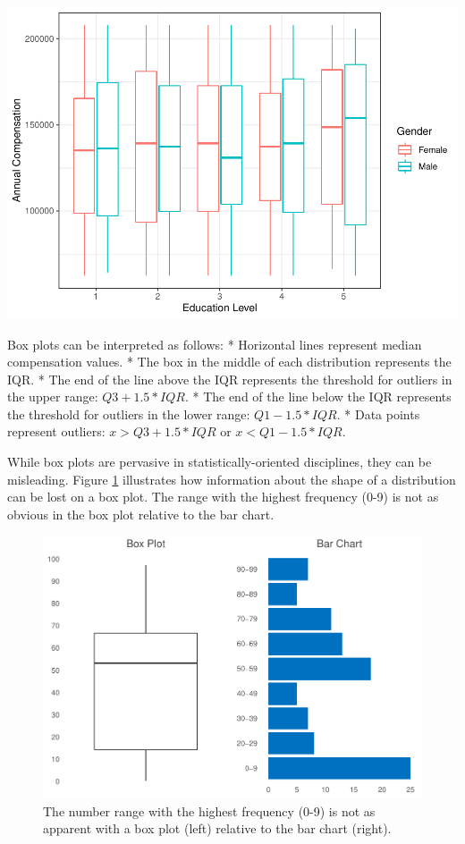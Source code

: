 \documentclass[
]{book}
\begin{document}
\includegraphics{The_Fundamentals_of_People_Analytics_files/figure-latex/unnamed-chunk-107-1.pdf}

Box plots can be interpreted as follows:
* Horizontal lines represent median compensation values.
* The box in the middle of each distribution represents the IQR.
* The end of the line above the IQR represents the threshold for outliers in the upper range: \(Q3 + 1.5 * IQR\).
* The end of the line below the IQR represents the threshold for outliers in the lower range: \(Q1 - 1.5 * IQR\).
* Data points represent outliers: \(x > Q3 + 1.5 * IQR\) or \(x < Q1 - 1.5 * IQR\).

While box plots are pervasive in statistically-oriented disciplines, they can be misleading. Figure \ref{fig:boxplot-barchart-compare} illustrates how information about the shape of a distribution can be lost on a box plot. The range with the highest frequency (0-9) is not as obvious in the box plot relative to the bar chart.

\begin{figure}

{\centering \includegraphics[width=1\linewidth]{The_Fundamentals_of_People_Analytics_files/figure-latex/boxplot-barchart-compare-1} 

}

\caption{The number range with the highest frequency (0-9) is not as apparent with a box plot (left) relative to the bar chart (right).}\label{fig:boxplot-barchart-compare}
\end{figure}
\end{document}
